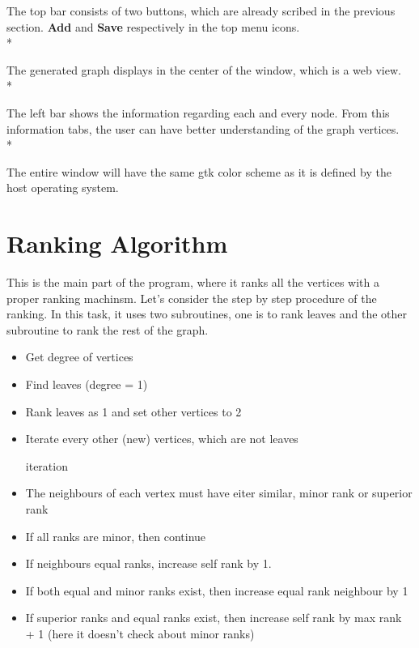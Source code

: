 \documentclass[11pt]{article}
\begin{document}
The top bar consists of two buttons, which are already scribed in the previous section. \textbf{Add} and \textbf{Save} respectively in the top menu icons.\\*

\noindent
The generated graph displays in the center of the window, which is a web view. \\*

\noindent
The left bar shows the information regarding each and every node. From this information tabs, the user can have better understanding of the graph vertices.\\*

\noindent
The entire window will have the same gtk color scheme as it is defined by the host operating system. 

\section{Ranking Algorithm}

This is the main part of the program, where it ranks all the vertices with a proper ranking machinsm. Let's consider the step by step procedure of the ranking. In this task, it uses two subroutines, one is to rank leaves and the other subroutine to rank the rest of the graph. 

\begin{itemize}
  \item Get degree of vertices
  \item Find leaves (degree = 1)
  \item Rank leaves as 1 and set other vertices to 2
  \item Iterate every other (new) vertices, which are not leaves
  \item [iteration]
  \item The neighbours of each vertex must have eiter similar, minor rank or superior rank
  \item If all ranks are minor, then continue
  \item If neighbours equal ranks, increase self rank by 1.
  \item If both equal and minor ranks exist, then increase equal rank neighbour by 1
  \item If superior ranks and equal ranks exist, then increase self rank by max rank + 1 (here it doesn't check about minor ranks)
\end{itemize}
\end{document}
